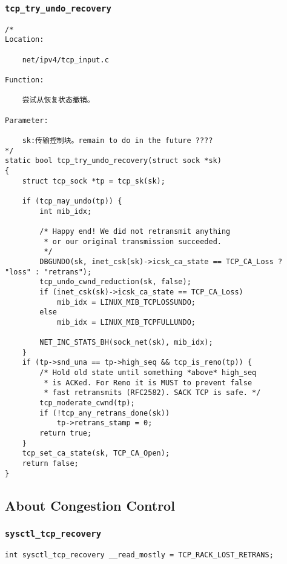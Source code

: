         \subsubsection{\texttt{tcp_try_undo_recovery}}
\begin{verbatim}
/* 
Location:

    net/ipv4/tcp_input.c

Function:

    尝试从恢复状态撤销。

Parameter:

    sk:传输控制块。remain to do in the future ????
*/
static bool tcp_try_undo_recovery(struct sock *sk)
{
    struct tcp_sock *tp = tcp_sk(sk);

    if (tcp_may_undo(tp)) {
        int mib_idx;

        /* Happy end! We did not retransmit anything
         * or our original transmission succeeded.
         */
        DBGUNDO(sk, inet_csk(sk)->icsk_ca_state == TCP_CA_Loss ? "loss" : "retrans");
        tcp_undo_cwnd_reduction(sk, false);
        if (inet_csk(sk)->icsk_ca_state == TCP_CA_Loss)
            mib_idx = LINUX_MIB_TCPLOSSUNDO;
        else
            mib_idx = LINUX_MIB_TCPFULLUNDO;

        NET_INC_STATS_BH(sock_net(sk), mib_idx);
    }
    if (tp->snd_una == tp->high_seq && tcp_is_reno(tp)) {
        /* Hold old state until something *above* high_seq
         * is ACKed. For Reno it is MUST to prevent false
         * fast retransmits (RFC2582). SACK TCP is safe. */
        tcp_moderate_cwnd(tp);
        if (!tcp_any_retrans_done(sk))
            tp->retrans_stamp = 0;
        return true;
    }
    tcp_set_ca_state(sk, TCP_CA_Open);
    return false;
}
\end{verbatim}
    \subsection{About Congestion Control}
        \subsubsection{\texttt{sysctl_tcp_recovery}}
\begin{verbatim}
int sysctl_tcp_recovery __read_mostly = TCP_RACK_LOST_RETRANS;
\end{verbatim}
